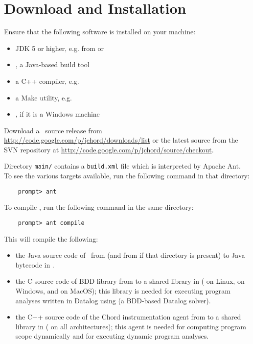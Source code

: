 \section{Download and Installation}
\label{sec:download-and-installation}

Ensure that the following software is installed on your machine:

\begin{itemize}
\item
JDK 5 or higher, e.g. from  or
\item
{}, a Java-based build tool
\item
a C++ compiler, e.g. 
\item
a Make utility, e.g. 
\item
{}, if it is a Windows machine
\end{itemize}

Download a \Chord\ source release from \url{http://code.google.com/p/jchord/downloads/list} or
the latest source from the SVN repository at \url{http://code.google.com/p/jchord/source/checkout}.

Directory {\tt main/} contains a {\tt build.xml} file which is interpreted by Apache Ant.
To see the various targets available, run the following command in that directory:

\begin{verbatim}
    prompt> ant
\end{verbatim}

\noindent To compile \Chord, run the following command in the same directory:

\begin{verbatim}
    prompt> ant compile
\end{verbatim}

\noindent This will compile the following:
\begin{itemize}
\item
the Java source code of \Chord\ from  (and from  if that directory is present) to Java bytecode in .
\item
the C source code of BDD library  from  to a shared library in  ( on Linux,  on Windows, and  on MacOS); this library is needed for executing program analyses written in Datalog using  (a BDD-based Datalog solver).
\item
the C++ source code of the Chord instrumentation agent from  to a shared library in  ( on all architectures); this agent is needed for computing program scope dynamically and for executing dynamic program analyses.
\end{itemize}


